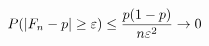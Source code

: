 \documentclass[preview]{standalone}
\begin{document}
\begin{align*}
\special{dvisvgm:raw <g id='unique000'>}P(|F_n-p|\ge\varepsilon)\le\frac{p(1-p)}{n\varepsilon^2}\to0\special{dvisvgm:raw </g>}
\end{align*}
\end{document}
